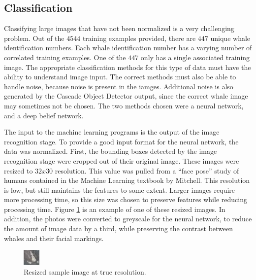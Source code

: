 \documentclass[10pt]{IEEEtran}
\newcommand{\?}{\stackrel{?}{=}}
\begin{document}
\subsection{Classification}
Classifying large images that have not been normalized is a very challenging
problem. Out of the $4544$ training examples provided, there are $447$ unique
whale identification numbers. Each whale identification number has a varying
number of correlated training examples. One of the $447$ only has a single
associated training image. The appropriate classification methods for this 
type of data must have the ability to understand image input. The correct
methods must also be able to handle noise, because noise is present in the 
iamges. Additional noise is also generated by the Cascade Object Detector 
output, since the correct whale image may sometimes not be chosen. The two
methods chosen were a neural network, and a deep belief network. 

The input to the machine learning programs is the output of the image recognition
stage. To provide a good input format for the neural network, the data was 
normalized. First, the bounding boxes detected by the image recognition stage
were cropped out of their original image. These images were resized to $32x30$
resolution. This value was pulled from a ``face pose'' study of humans contained
in the Machine Learning textbook by Mitchell\cite{mitchell}. This resolution 
is low, but still maintains the features to some extent. Larger images require
more processing time, so this size was chosen to preserve features while reducing
processing time. Figure \ref{resized} is an example of one of these resized 
images. In addition, the photos were converted to greyscale for the neural
network, to reduce the amount of image data by a third, while preserving the 
contrast between whales and their facial markings.

\begin{figure}[H]
\begin{center}
\captionsetup{justification=centering}
\includegraphics[scale=1]{resized.png}
\caption{Resized sample image at true resolution.}
\label{resized}
\end{center}
\end{figure} 
\end{document}
